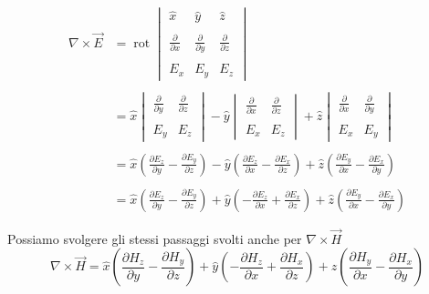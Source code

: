 {
    \Large
    \begin{equation}
        \begin{split}
        \nabla \times \vec{E} 
        &= \operatorname{rot} 
\begin{vmatrix}
    \hat{x} & \hat{y} &\hat{z} \\ \\ 
    \frac{\partial}{\partial x} & \frac{\partial}{\partial y} & \frac{\partial}{\partial z} \\ \\ 
    E_x & E_y & E_z
\end{vmatrix}  \\ \\
&= \hat{x} 
\begin{vmatrix}
    \frac{\partial}{\partial y} & \frac{\partial}{\partial z} \\  \\ 
    E_y & E_z 
\end{vmatrix}  
- \hat{y} 
\begin{vmatrix}
    \frac{\partial}{\partial x} & \frac{\partial}{\partial z} \\  \\ 
    E_x & E_z 
\end{vmatrix} 
+ \hat{z} 
\begin{vmatrix}
    \frac{\partial}{\partial x} & \frac{\partial}{\partial y} \\  \\ 
    E_x & E_y 
\end{vmatrix} \\ \\
&= \hat{x} (\frac{\partial E_z}{\partial y} - \frac{\partial E_y}{\partial z})
 - \hat{y} (\frac{\partial E_z}{\partial x} - \frac{\partial E_x}{\partial z})
 + \hat{z} (\frac{\partial E_y}{\partial x} - \frac{\partial E_x}{\partial y}) \\ \\
&= \hat{x} (\frac{\partial E_z}{\partial y} - \frac{\partial E_y}{\partial z})
 + \hat{y} (-\frac{\partial E_z}{\partial x} + \frac{\partial E_x}{\partial z})
 + \hat{z} (\frac{\partial E_y}{\partial x} - \frac{\partial E_x}{\partial y})
        \end{split}
    \end{equation}
}

Possiamo svolgere gli stessi passaggi svolti anche per $\nabla \times \vec{H}$ \\

{
    \Large
    \begin{equation}
\nabla \times \vec{H} 
= \hat{x} (\frac{\partial H_z}{\partial y} - \frac{\partial H_y}{\partial z})
+ \hat{y} (-\frac{\partial H_z}{\partial x} + \frac{\partial H_x}{\partial z})
+ \hat{z} (\frac{\partial H_y}{\partial x} - \frac{\partial H_x}{\partial y})
    \end{equation}
}

